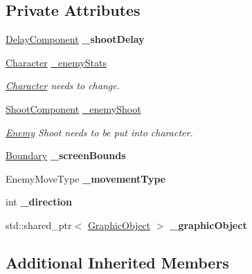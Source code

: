 \subsection*{Private Attributes}
\begin{DoxyCompactItemize}
\item 
\mbox{\label{class_enemy_a3c5bc99471cfa718af8e11b3b735d15c}} 
\hyperlink{class_delay_component}{Delay\+Component} {\bfseries \+\_\+shoot\+Delay}
\item 
\mbox{\label{class_enemy_a96c1fc789cc0fb766724ea1d75ad3179}} 
\hyperlink{class_character}{Character} \hyperlink{class_enemy_a96c1fc789cc0fb766724ea1d75ad3179}{\+\_\+enemy\+Stats}
\begin{DoxyCompactList}\small\item\em \hyperlink{class_character}{Character} needs to change. \end{DoxyCompactList}\item 
\mbox{\label{class_enemy_a36226438bbccc3aff98a575530a07346}} 
\hyperlink{class_shoot_component}{Shoot\+Component} \hyperlink{class_enemy_a36226438bbccc3aff98a575530a07346}{\+\_\+enemy\+Shoot}
\begin{DoxyCompactList}\small\item\em \hyperlink{class_enemy}{Enemy} Shoot needs to be put into character. \end{DoxyCompactList}\item 
\mbox{\label{class_enemy_afb32f85ca2f3dce003e62a91572bdb70}} 
\hyperlink{class_boundary}{Boundary} {\bfseries \+\_\+screen\+Bounds}
\item 
\mbox{\label{class_enemy_a7acb60cccd8ec80dc99fad62f17adbcf}} 
Enemy\+Move\+Type {\bfseries \+\_\+movement\+Type}
\item 
\mbox{\label{class_enemy_a671f316ff7ba3daf921dfe7f8e3075dc}} 
int {\bfseries \+\_\+direction}
\item 
\mbox{\label{class_enemy_ad07c96cc438e9144d0d66fd53a93eec3}} 
std\+::shared\+\_\+ptr$<$ \hyperlink{class_graphic_object}{Graphic\+Object} $>$ {\bfseries \+\_\+graphic\+Object}
\end{DoxyCompactItemize}
\subsection*{Additional Inherited Members}



